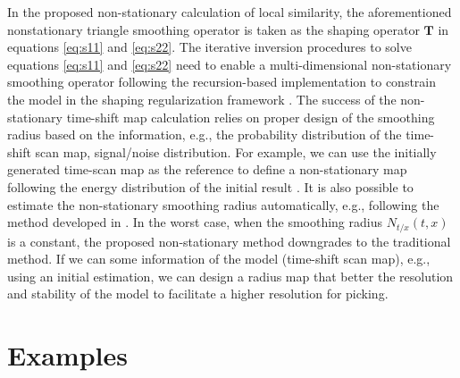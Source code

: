 In the proposed non-stationary calculation of local similarity, the aforementioned nonstationary  triangle smoothing operator is taken as the shaping operator $\mathbf{T}$ in equations \ref{eq:s11} and \ref{eq:s22}. The iterative inversion procedures to solve equations  \ref{eq:s11} and \ref{eq:s22} need to enable a multi-dimensional non-stationary smoothing operator following the recursion-based implementation to constrain the model in the shaping regularization framework \cite[]{fomel2007shape}. The success of the non-stationary time-shift map calculation relies on  proper design of the smoothing radius based on the  information, e.g., the probability distribution of the time-shift scan map,  signal/noise distribution. For example, we can use the initially generated time-scan map as the reference to define a non-stationary map following the energy distribution of the initial result \cite[]{yangkang2015svmf}. It is also possible to estimate the non-stationary smoothing radius automatically, e.g., following the method developed in \cite{greer2018matching}. In the worst case, when the smoothing radius $N_{t/x}(t,x)$ is a constant, the proposed non-stationary method downgrades to the traditional method. If we can  some  information of the model (time-shift scan map), e.g., using an initial estimation, we can design a radius map that better  the resolution and stability of the model to facilitate a higher resolution for picking. 


\section{Examples}
